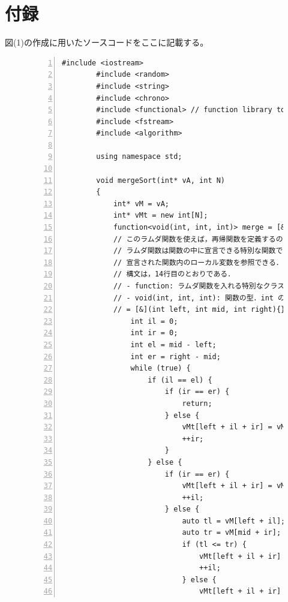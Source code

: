 \documentclass[fleqn, a4paper. 12pt]{ltjsarticle} %
\begin{document}
    \section{付録}
    図(1)の作成に用いたソースコードをここに記載する。
    \begin{figure}[b]
      \begin{lstlisting}[mathescape=true, numbers=left]
        #include <iostream>
        #include <random>
        #include <string>
        #include <chrono>
        #include <functional> // function library to define a function in a function
        #include <fstream>
        #include <algorithm>
        
        using namespace std;
        
        void mergeSort(int* vA, int N)
        {
            int* vM = vA;
            int* vMt = new int[N];
            function<void(int, int, int)> merge = [&](int left, int mid, int right) { // lambda function.
            // このラムダ関数を使えば，再帰関数を定義するのに，わざわざグローバル領域に関数を宣言せずにすむ．
            // ラムダ関数は関数の中に宣言できる特別な関数である．
            // 宣言された関数内のローカル変数を参照できる．
            // 構文は，14行目のとおりである．
            // - function: ラムダ関数を入れる特別なクラス
            // - void(int, int, int): 関数の型．int の引数がmergeソートの要件から3つほしいため，このように定義している．返り値必要ないため void とした．
            // = [&](int left, int mid, int right){}: 関数の処理内容の定義．& はローカル変数をラムダ関数の中で改変可能とする宣言．ほかは普通の関数と同様の意味
                int il = 0;
                int ir = 0;
                int el = mid - left;
                int er = right - mid;
                while (true) {
                    if (il == el) {
                        if (ir == er) {
                            return;
                        } else {
                            vMt[left + il + ir] = vM[mid + ir];
                            ++ir;
                        }
                    } else {
                        if (ir == er) {
                            vMt[left + il + ir] = vM[left + il];
                            ++il;
                        } else {
                            auto tl = vM[left + il];
                            auto tr = vM[mid + ir];
                            if (tl <= tr) {
                                vMt[left + il + ir] = tl;
                                ++il;
                            } else {
                                vMt[left + il + ir] = tr;

\end{lstlisting}
\end{figure}
\end{document}
